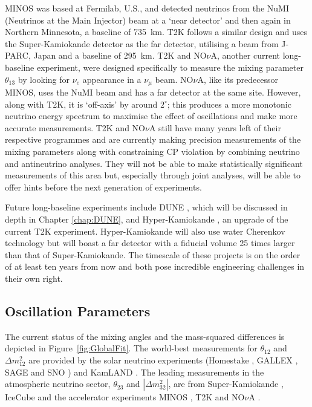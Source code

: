 MINOS was based at Fermilab, U.S., and detected neutrinos from the NuMI (Neutrinos at the Main Injector) beam at a `near detector' and then again in Northern Minnesota, a baseline of 735~km.  T2K follows a similar design and uses the Super-Kamiokande detector as the far detector, utilising a beam from J-PARC, Japan and a baseline of 295~km.  T2K and NO$\nu$A, another current long-baseline experiment, were designed specifically to measure the mixing parameter $\theta_{13}$ by looking for $\nu_e$ appearance in a $\nu_{\mu}$ beam.  NO$\nu$A, like its predecessor MINOS, uses the NuMI beam and has a far detector at the same site.  However, along with T2K, it is `off-axis' by around $2^{\circ}$; this produces a more monotonic neutrino energy spectrum to maximise the effect of oscillations and make more accurate measurements.  T2K and NO$\nu$A still have many years left of their respective programmes and are currently making precision measurements of the mixing parameters along with constraining CP violation by combining neutrino and antineutrino analyses.  They will not be able to make statistically significant measurements of this area but, especially through joint analyses, will be able to offer hints before the next generation of experiments.

Future long-baseline experiments include DUNE \cite{DUNECDR1}, which will be discussed in depth in Chapter \ref{chap:DUNE}, and Hyper-Kamiokande \cite{HyperKamiokande2015}, an upgrade of the current T2K experiment.  Hyper-Kamiokande will also use water Cherenkov technology but will boast a far detector with a fiducial volume 25 times larger than that of Super-Kamiokande.  The timescale of these projects is on the order of at least ten years from now and both pose incredible engineering challenges in their own right.

\subsection{Oscillation Parameters}\label{sec:OscillationParameters}

The current status of the mixing angles and the mass-squared differences is depicted in Figure~\ref{fig:GlobalFit}.  The world-best measurements for $\theta_{12}$ and $\Delta m^2_{12}$ are provided by the solar neutrino experiments (Homestake \cite{Cleveland1995}, GALLEX \cite{Gallex2010}, SAGE \cite{Sage2009} and SNO \cite{SNO2013}) and KamLAND \cite{KamLAND2013}.  The leading measurements in the atmospheric neutrino sector, $\theta_{23}$ and $|\Delta m_{32}^2|$, are from Super-Kamiokande \cite{SuperKamiokande2010}, IceCube \cite{IceCube2015} and the accelerator experiments MINOS \cite{MINOS2013,MINOS2013b}, T2K \cite{T2Knumu2014} and NO$\nu$A \cite{NOvAnumu2016}.

